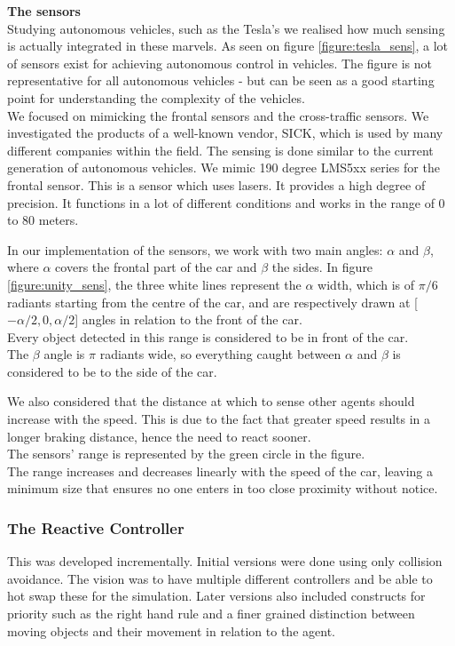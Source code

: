 \noindent
\textbf{The sensors}\\
Studying autonomous vehicles, such as the Tesla's we realised how much sensing is actually integrated in these marvels.
As seen on figure \ref{figure:tesla_sens}, a lot of sensors exist for achieving autonomous control in vehicles.
The figure is not representative for all autonomous vehicles - but can be seen as a good starting point for understanding the complexity of the vehicles.\\

We focused on mimicking the frontal sensors and the cross-traffic sensors.
We investigated the products of a well-known vendor, SICK, which is used by many different companies within the field.
The sensing is done similar to the current generation of autonomous vehicles. We mimic 190 degree LMS5xx series for the frontal sensor. This is a sensor which uses lasers. It provides a high degree of precision. It functions in a lot of different conditions and works in the range of 0 to 80 meters.
\newline

In our implementation of the sensors, we work with two main angles: $\alpha$ and $\beta$, where $\alpha$  covers the frontal part of the car and $\beta$ the sides.
In figure \ref{figure:unity_sens}, the three white lines represent the $\alpha$ width, which is of $\pi/6$ radiants starting from the centre of the car, and are respectively drawn at [$-\alpha/2, 0, \alpha/2$] angles in relation to the front of the car.\\
Every object detected in this range is considered to be in front of the car.\\

The $\beta$ angle is $\pi$ radiants wide, so everything caught between $\alpha$ and $\beta$ is considered to be to the side of the car.


We also considered that the distance at which to sense other agents should increase with the speed.
This is due to the fact that greater speed results in a longer braking distance, hence the need to react sooner.\\
The sensors' range is represented by the green circle in the figure. \\
The range increases and decreases linearly with the speed of the car, leaving a minimum size that ensures no one enters in too close proximity without notice. 



\subsubsection{The Reactive Controller}
This was developed incrementally. Initial versions were done using only collision avoidance.
The vision was to have multiple different controllers and be able to hot swap these for the simulation.
Later versions also included constructs for priority such as the right hand rule and a finer grained distinction between moving objects and their movement in relation to the agent.\\

